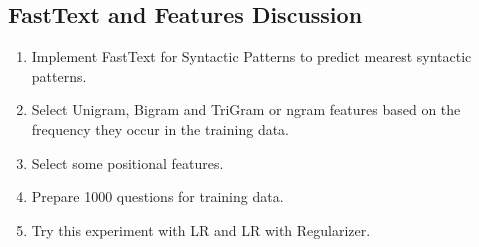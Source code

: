 \documentclass[11pt]{article}
\begin{document}
\subsection{FastText and Features Discussion}
\begin{enumerate}
\item Implement FastText for Syntactic Patterns to predict mearest syntactic patterns.
\item Select Unigram, Bigram and TriGram or ngram features based on the frequency they occur in the training data.
\item Select some positional features.
\item Prepare 1000 questions for training data.
\item Try this experiment with LR and LR with Regularizer.
\end{enumerate}
\end{document}

